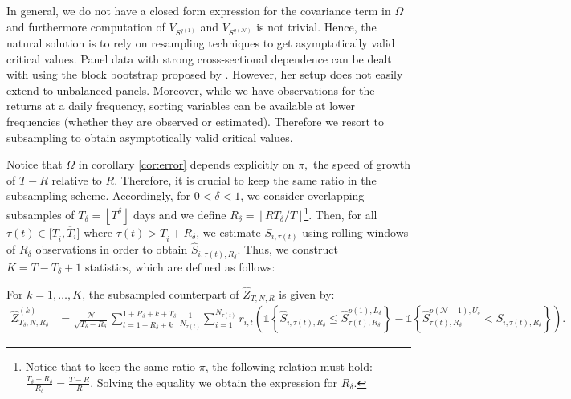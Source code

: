 In general, we do not have a closed form expression for the covariance term in $\Omega$ and furthermore computation of $V_{S^{q(1)}}$ and $V_{S^{q(\mathcal{N})}}$ is not trivial. Hence, the natural solution is to rely on resampling techniques to get asymptotically valid critical values. Panel data with strong cross-sectional dependence can be dealt with using the block bootstrap proposed by \cite{gonccalves2011moving}. However, her setup does not easily extend to unbalanced panels. Moreover, while we have observations for the returns at a daily frequency, sorting variables can be available at lower frequencies (whether they are observed or estimated). Therefore we resort to subsampling to obtain asymptotically valid critical values.

Notice that $\Omega$ in corollary \ref{cor:error} depends explicitly on $\pi,$ the speed of growth of $T-R$ relative to $R$. Therefore, it is crucial to keep the same ratio in the subsampling scheme. Accordingly, for $0<\delta<1$, we consider overlapping subsamples of $T_{\delta}=\left\lfloor T^{\delta}\right\rfloor$ days and we define $R_\delta = \left\lfloor R T_\delta / T \right\rfloor$\footnote{Notice that to keep the same ratio $\pi$, the following relation must hold: $\frac{T_\delta - R_\delta}{R_\delta} = \frac{T - R}{R}$. Solving the equality we obtain the expression for $R_\delta$.}. Then, for all $\tau(t) \in \lbrack \underline{T}_{i},\overline{T}_{i} \rbrack$ where $\tau(t) >\underline{T}_{i}+R_\delta$, we estimate $S_{i,\tau(t)}$ using rolling windows of $R_\delta$ observations in order to obtain $\widehat{S}_{i,\tau(t),R_\delta}$. Thus, we construct $K=T-T_\delta+1$ statistics, which are defined as follows: 

\begin{definition}
For $k=1,\ldots,K$, the subsampled counterpart of $\widehat{Z}_{T,N,R}$ is given by:
\begin{align*}
    \widehat{Z}_{T_\delta,N,R_\delta}^{(k)} &= \frac{\mathcal{N}}{\sqrt{T_\delta - R_\delta}} \sum_{t=1+R_\delta+k}^{1+R_\delta+k+T_\delta}\frac{1}{N_{\tau(t)}}\sum_{i=1}^{N_{\tau(t)}}r_{i,t}\left( \mathds{1}\left\{ \widehat{S}_{i,\tau(t),R_\delta}\leq \widehat{S}_{\tau(t) ,R_\delta}^{p(1), L_\delta}\right\} - \mathds{1}\left\{ \widehat{S}_{\tau(t), R_\delta}^{p(\mathcal{N}-1), U_\delta} < \widehat{S}_{i,\tau(t), R_\delta} \right\} \right). 
\end{align*}
\end{definition}

